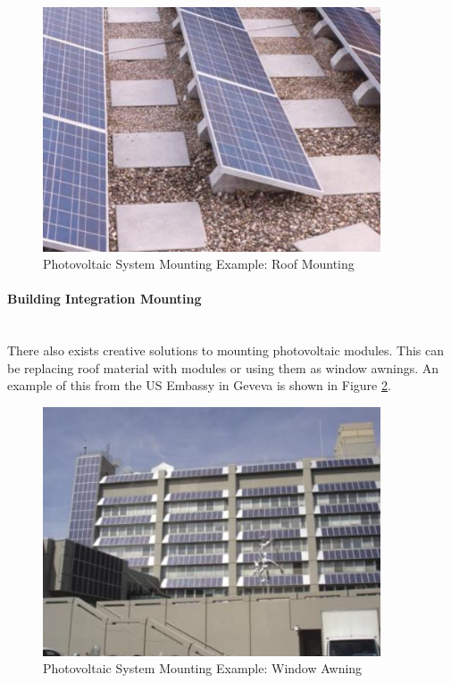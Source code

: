 \begin{figure}[H]
	\hfill\includegraphics[width = 100mm]{images/pv-roof-mounting}\hspace*{\fill}
	\caption{Photovoltaic System Mounting Example: Roof Mounting \cite{Haberlin2012}} 
	\label{fig:pv-mounting-fixed-roof}
\end{figure}  

\paragraph{Building Integration Mounting}
~\\
There also exists creative solutions to mounting photovoltaic modules. This can be replacing roof material with modules or using them as window awnings. An example of this from the US Embassy in Geveva is shown in Figure \ref{fig:pv-mounting-fixed-windows}.  

\begin{figure}[H]
	\hfill\includegraphics[width = 100mm]{images/pv-mouting-windows}\hspace*{\fill}
	\caption{Photovoltaic System Mounting Example: Window Awning \cite{Haberlin2012}} 
	\label{fig:pv-mounting-fixed-windows}
\end{figure} 

